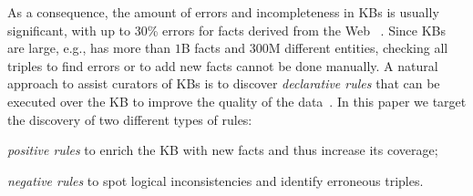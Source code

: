 As a %
consequence, the amount of errors and incompleteness in KBs is usually significant, with up to 30\% errors for facts derived from the Web%
~\cite{abedjan2015temporal,suchanek2009sofie}.
Since KBs are large, e.g., \wikidata has more than $1$B facts and $300$M different entities, %
checking all triples to find errors or to add new facts cannot be done manually. %
A natural approach to assist curators of KBs is to discover %
\emph{declarative rules} that can be executed over the KB to improve the quality of the data~\cite{Chen:2016,abedjan2014amending,galarraga2015fast}. 
In this paper we target the discovery %
of two different types of rules:
\begin{inparaenum}[\itshape(i)]
	\item {\em positive rules} to enrich the KB with new facts and thus increase its coverage; %
	\item {\em negative rules} to spot logical inconsistencies and identify erroneous triples.
\end{inparaenum}

